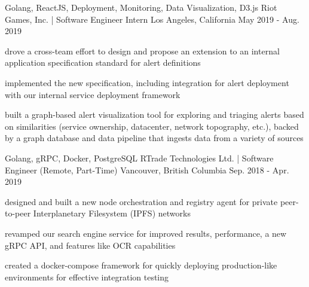 

\begin{cventries}

  \cventry
    {Golang, ReactJS, Deployment, Monitoring, Data Visualization, D3.js} %
    {Riot Games, Inc. | Software Engineer Intern} %
    {Los Angeles, California} %
    {May 2019 - Aug. 2019} %
    {
      \begin{cvitems} %
        \item {drove a cross-team effort to design and propose an extension to an internal application specification standard for alert definitions}
        \item{implemented the new specification, including integration for alert deployment with our internal service deployment framework}
        \item {built a graph-based alert visualization tool for exploring and triaging alerts based on similarities (service ownership, datacenter, network topography, etc.), backed by a graph database and data pipeline that ingests data from a variety of sources}
      \end{cvitems}
    }

  \cventry
    {Golang, gRPC, Docker, PostgreSQL} %
    {RTrade Technologies Ltd. | Software Engineer (Remote, Part-Time)} %
    {Vancouver, British Columbia} %
    {Sep. 2018 - Apr. 2019} %
    {
      \begin{cvitems} %
        \item {designed and built a new node orchestration and registry agent for private  peer-to-peer Interplanetary Filesystem (IPFS) networks}
        \item {revamped our search engine service for improved results, performance, a new gRPC API, and features like OCR capabilities}
        \item {created a docker-compose framework for quickly deploying production-like environments for effective integration testing}
      \end{cvitems}
    }


\end{cventries}
